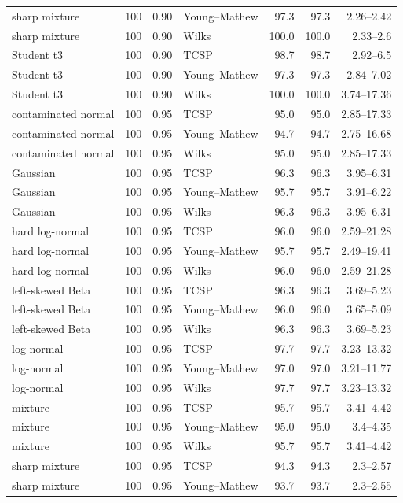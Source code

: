 \begin{longtable}{@{}p{}rrp{}rrr@{}}
sharp mixture & 100 & 0.90 & Young--Mathew & 97.3 & 97.3 & 2.26--2.42 \\
sharp mixture & 100 & 0.90 & Wilks & 100.0 & 100.0 & 2.33--2.6 \\
Student t3 & 100 & 0.90 & TCSP & 98.7 & 98.7 & 2.92--6.5 \\
Student t3 & 100 & 0.90 & Young--Mathew & 97.3 & 97.3 & 2.84--7.02 \\
Student t3 & 100 & 0.90 & Wilks & 100.0 & 100.0 & 3.74--17.36 \\
contaminated normal & 100 & 0.95 & TCSP & 95.0 & 95.0 & 2.85--17.33 \\
contaminated normal & 100 & 0.95 & Young--Mathew & 94.7 & 94.7 & 2.75--16.68 \\
contaminated normal & 100 & 0.95 & Wilks & 95.0 & 95.0 & 2.85--17.33 \\
Gaussian & 100 & 0.95 & TCSP & 96.3 & 96.3 & 3.95--6.31 \\
Gaussian & 100 & 0.95 & Young--Mathew & 95.7 & 95.7 & 3.91--6.22 \\
Gaussian & 100 & 0.95 & Wilks & 96.3 & 96.3 & 3.95--6.31 \\
hard log-normal & 100 & 0.95 & TCSP & 96.0 & 96.0 & 2.59--21.28 \\
hard log-normal & 100 & 0.95 & Young--Mathew & 95.7 & 95.7 & 2.49--19.41 \\
hard log-normal & 100 & 0.95 & Wilks & 96.0 & 96.0 & 2.59--21.28 \\
left-skewed Beta & 100 & 0.95 & TCSP & 96.3 & 96.3 & 3.69--5.23 \\
left-skewed Beta & 100 & 0.95 & Young--Mathew & 96.0 & 96.0 & 3.65--5.09 \\
left-skewed Beta & 100 & 0.95 & Wilks & 96.3 & 96.3 & 3.69--5.23 \\
log-normal & 100 & 0.95 & TCSP & 97.7 & 97.7 & 3.23--13.32 \\
log-normal & 100 & 0.95 & Young--Mathew & 97.0 & 97.0 & 3.21--11.77 \\
log-normal & 100 & 0.95 & Wilks & 97.7 & 97.7 & 3.23--13.32 \\
mixture & 100 & 0.95 & TCSP & 95.7 & 95.7 & 3.41--4.42 \\
mixture & 100 & 0.95 & Young--Mathew & 95.0 & 95.0 & 3.4--4.35 \\
mixture & 100 & 0.95 & Wilks & 95.7 & 95.7 & 3.41--4.42 \\
sharp mixture & 100 & 0.95 & TCSP & 94.3 & 94.3 & 2.3--2.57 \\
sharp mixture & 100 & 0.95 & Young--Mathew & 93.7 & 93.7 & 2.3--2.55 \\

\end{longtable}
